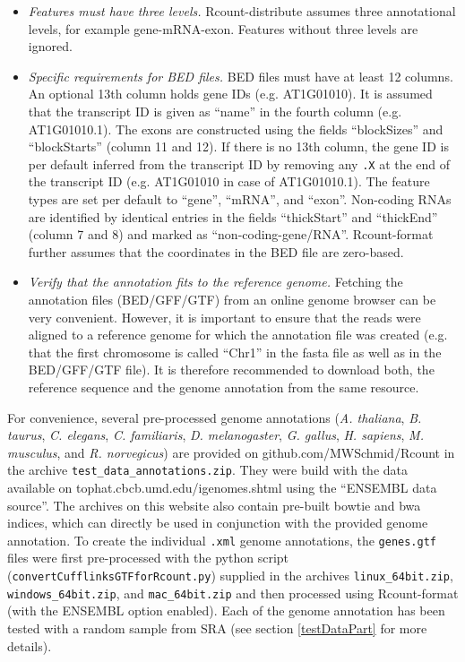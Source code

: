 \documentclass[a4paper,10pt]{article}
\newcommand{\myWeb}{github.com/MWSchmid/Rcount}
\begin{document}
\begin{itemize}
 \item \textit{Features must have three levels.}\newline
Rcount-distribute assumes three annotational levels, for example gene-mRNA-exon. Features without three levels are ignored.
 \item \textit{Specific requirements for BED files.}\newline
BED files must have at least 12 columns. An optional 13th column holds gene IDs (e.g. AT1G01010). It is assumed that the transcript ID is given as ``name'' in the fourth column (e.g. AT1G01010.1). The exons are constructed using the fields ``blockSizes'' and ``blockStarts'' (column 11 and 12). If there is no 13th column, the gene ID is per default inferred from the transcript ID by removing any \texttt{.X} at the end of the transcript ID (e.g. AT1G01010 in case of AT1G01010.1). The feature types are set per default to ``gene'', ``mRNA'', and ``exon''. Non-coding RNAs are identified by identical entries in the fields ``thickStart'' and ``thickEnd'' (column 7 and 8) and marked as ``non-coding-gene/RNA''. Rcount-format further assumes that the coordinates in the BED file are zero-based. 
 \item \textit{Verify that the annotation fits to the reference genome.}\newline
Fetching the annotation files (BED/GFF/GTF) from an online genome browser can be very convenient. However, it is important to ensure that the reads were aligned to a reference genome for which the annotation file was created (e.g. that the first chromosome is called ``Chr1'' in the fasta file as well as in the BED/GFF/GTF file). It is therefore recommended to download both, the reference sequence and the genome annotation from the same resource.
\end{itemize}
For convenience, several pre-processed genome annotations (\textit{A. thaliana}, \textit{B. taurus}, \textit{C. elegans}, \textit{C. familiaris}, \textit{D. melanogaster}, \textit{G. gallus}, \textit{H. sapiens}, \textit{M. musculus}, and \textit{R. norvegicus}) are provided on {\myWeb} in the archive \texttt{test\_data\_annotations.zip}. They were build with the data available on tophat.cbcb.umd.edu/igenomes.shtml using the ``ENSEMBL data source''. The archives on this website also contain pre-built bowtie and bwa indices, which can directly be used in conjunction with the provided genome annotation. To create the individual \texttt{.xml} genome annotations, the \texttt{genes.gtf} files were first pre-processed with the python script (\texttt{convertCufflinksGTFforRcount.py}) supplied in the archives \texttt{linux\_64bit.zip}, \texttt{windows\_64bit.zip}, and \texttt{mac\_64bit.zip} and then processed using Rcount-format (with the ENSEMBL option enabled). Each of the genome annotation has been tested with a random sample from SRA (see section \ref{testDataPart} for more details).
\end{document}
